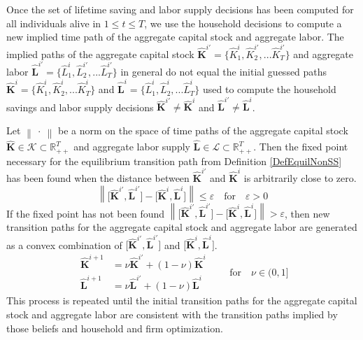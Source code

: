 \documentclass[letterpaper,12pt]{article}
\theoremstyle{definition}
\newcommand\ve{\varepsilon}
\newcommand\norm[1]{\left\lVert#1\right\rVert}
\begin{document}
  Once the set of lifetime saving and labor supply decisions has been computed for all individuals alive in $1\leq t\leq T$, we use the household decisions to compute a new implied time path of the aggregate capital stock and aggregate labor. The implied paths of the aggregate capital stock $\bm{\hat{K}}^{i'}=\{\hat{K}_1^i,\hat{K}_2^{i'},...\hat{K}_T^{i'}\}$ and aggregate labor $\bm{\hat{L}}^{i'}=\{\hat{L}_1^i,\hat{L}_2^{i'},...\hat{L}_T^{i'}\}$ in general do not equal the initial guessed paths $\bm{\hat{K}}^{i}=\{\hat{K}_1^i,\hat{K}_2^{i},...\hat{K}_T^{i}\}$ and $\bm{\hat{L}}^{i}=\{\hat{L}_1^i,\hat{L}_2^{i},...\hat{L}_T^{i}\}$ used to compute the household savings and labor supply decisions $\bm{\hat{K}}^{i'}\neq\bm{\hat{K}}^i$ and $\bm{\hat{L}}^{i'}\neq\bm{\hat{L}}^i$.

  Let $\norm{\:\cdot\:}$ be a norm on the space of time paths of the aggregate capital stock $\bm{\hat{K}}\in\mathcal{K}\subset\mathbb{R}_{++}^T$ and aggregate labor supply $\bm{\hat{L}}\in\mathcal{L}\subset\mathbb{R}_{++}^T$. Then the fixed point necessary for the equilibrium transition path from Definition \ref{DefEquilNonSS} has been found when the distance between $\bm{\hat{K}}^{i'}$ and $\bm{\hat{K}}^{i}$ is arbitrarily close to zero.
  \begin{equation}\label{EqTPIconverge}
    \norm{\bigl[\bm{\hat{K}}^{i'}, \bm{\hat{L}}^{i'}\bigr] - \bigl[\bm{\hat{K}}^{i},\bm{\hat{L}}^{i}\bigr]} \leq \ve \quad\text{for}\quad \ve>0
  \end{equation}
  If the fixed point has not been found $\norm{\bigl[\bm{\hat{K}}^{i'}, \bm{\hat{L}}^{i'}\bigr] - \bigl[\bm{\hat{K}}^{i},\bm{\hat{L}}^{i}\bigr]} > \ve$, then new transition paths for the aggregate capital stock and aggregate labor are generated as a convex combination of $\bigl[\bm{\hat{K}}^{i'},\bm{\hat{L}}^{i'}\bigr]$ and $\bigl[\bm{\hat{K}}^{i},\bm{\hat{L}}^{i}\bigr]$.
  \begin{equation}\label{EqTPInewpath}
    \begin{split}
      \bm{\hat{K}}^{i+1} &= \nu\bm{\hat{K}}^{i'} + (1-\nu)\bm{\hat{K}}^{i} \\
      \bm{\hat{L}}^{i+1} &= \nu\bm{\hat{L}}^{i'} + (1-\nu)\bm{\hat{L}}^{i}
    \end{split} \quad\quad\text{for}\quad \nu\in(0,1]
  \end{equation}
  This process is repeated until the initial transition paths for the aggregate capital stock and aggregate labor are consistent with the transition paths implied by those beliefs and household and firm optimization.
\end{document}
